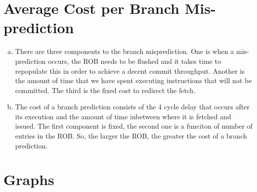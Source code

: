 \documentclass[12pt,twoside]{article}
\begin{document}
\section{Average Cost per Branch Mis-prediction}
\begin{enumerate}[a)]
\item There are three components to the branch misprediction.  One is when a
  mis-prediction occurs, the ROB needs to be flushed and it takes time to
  repopulate this in order to achieve a decent commit throughput.  Another is
  the amount of time that we have spent executing instructions that will not be
  committed.  The third is the fixed cost to redirect the fetch.
\item The cost of a branch prediction consists of the 4 cycle delay that occurs
  after its execution and the amount of time inbetween where it is fetched and
  issued.  The first component is fixed, the second one is a funciton of number
  of entries in the ROB.  So, the larger the ROB, the greater the cost of a
  branch prediction.
\end{enumerate}

\newpage
\section{Graphs}
\end{document}
